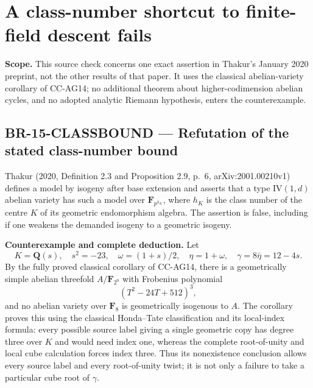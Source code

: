 \section{A class-number shortcut to finite-field descent fails}
\label{root-class-number-descent}

\textbf{Scope.} This source check concerns one exact assertion in
Thakur's January 2020 preprint, not the other results of that paper.
It uses the classical abelian-variety corollary of CC-AG14; no
additional theorem about higher-codimension abelian cycles, and no
adopted analytic Riemann hypothesis, enters the counterexample.

\subsection{BR-15-CLASSBOUND --- Refutation of the stated class-number bound}

Thakur (2020, Definition 2.3 and Proposition 2.9, p.~6,
arXiv:2001.00210v1) defines a model by isogeny after base extension
and asserts that a type $\mathrm{IV}(1,d)$ abelian variety has such a
model over $\mathbf F_{p^{h_K}}$, where $h_K$ is the class number of
the centre $K$ of its geometric endomorphism algebra. The assertion
is false, including if one weakens the demanded isogeny to a geometric
isogeny.

\textbf{Counterexample and complete deduction.} Let
\[
 K=\mathbf Q(s),\quad s^2=-23,\quad
 \omega=(1+s)/2,\quad \eta=1+\omega,\quad
 \gamma=8\bar\eta=12-4s.
\]
By the fully proved classical corollary of CC-AG14, there is a
geometrically simple abelian threefold $A/\mathbf F_{2^9}$ with
Frobenius polynomial
\[
                 (T^2-24T+512)^3,
\]
and no abelian variety over $\mathbf F_8$ is geometrically isogenous
to $A$. The corollary proves this using the classical Honda--Tate
classification and its local-index formula: every possible source
label giving a single geometric copy has degree three over $K$ and
would need index one, whereas the complete root-of-unity and local
cube calculation forces index three. Thus its nonexistence conclusion
allows every source label and every root-of-unity twist; it is not
only a failure to take a particular cube root of $\gamma$.

